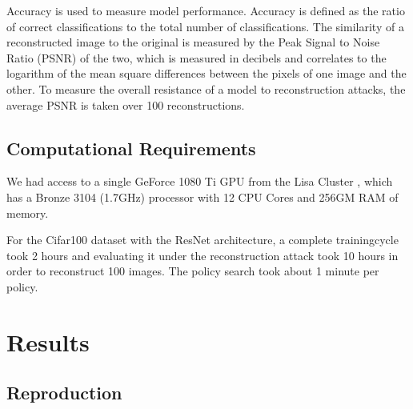 Accuracy is used to measure model performance. Accuracy is defined as the ratio of correct classifications to the total number of classifications. The similarity of a reconstructed image to the original is measured by the Peak Signal to Noise Ratio (PSNR) \cite{hore2010image} of the two, which is measured in decibels and correlates to the logarithm of the mean square differences between the pixels of one image and the other. To measure the overall resistance of a model to reconstruction attacks, the average PSNR is taken over 100 reconstructions.

\subsection{Computational Requirements}
We had access to a single GeForce 1080 Ti GPU from the Lisa Cluster
\cite{lisac}, which has a Bronze 3104 (1.7GHz) processor with 12 CPU Cores and 256GM RAM of memory. %

For the Cifar100 dataset with the ResNet architecture, a complete trainingcycle took 2 hours and evaluating it under the reconstruction attack took 10 hours in order to reconstruct 100 images. The policy search took about 1 minute per policy.


\section{Results}

\subsection{Reproduction}

